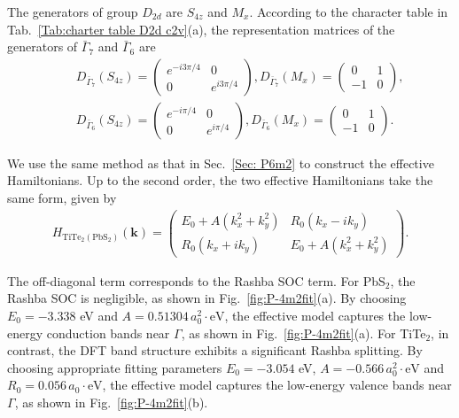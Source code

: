 \documentclass[aps, preprint, prb,]{revtex4-2}
\begin{document}
The generators of group $D_{2d}$ are $S_{4z}$ and $M_x$. According to the character table in Tab.~\ref{Tab:charter table D2d c2v}(a), the representation matrices of the generators  of $\bar{\Gamma}_7$ and $\bar{\Gamma}_6$ are 
\begin{eqnarray}
&&D_{\bar{\Gamma}_7}(S_{4z})=
\begin{pmatrix}
e^{-i3\pi/4} & 0\\
0 & e^{i3\pi/4}
\end{pmatrix},  
D_{\bar{\Gamma}_7}(M_x)=
\begin{pmatrix}
0 & 1\\
-1 & 0
\end{pmatrix},\\
&&D_{\bar{\Gamma}_6}(S_{4z})=
\begin{pmatrix}
e^{-i\pi/4} & 0\\
0 & e^{i\pi/4}
\end{pmatrix},  
D_{\bar{\Gamma}_6}(M_x)=
\begin{pmatrix}
0 & 1\\
-1 & 0
\end{pmatrix}.
\end{eqnarray}

We use the same method as that in Sec.~\ref{Sec: P6m2} to construct the effective Hamiltonians. Up to the second order, the two effective Hamiltonians take the same form, given by 
\begin{eqnarray}
H_{\mathrm{TiTe}_2(\mathrm{PbS}_2)}(\mathbf{k})=
\begin{pmatrix}
E_0+A(k_x^2+k_y^2) & R_0(k_x-i k_y)\\
R_0(k_x+i k_y) & E_0+A(k_x^2+k_y^2)
\end{pmatrix}.    
\end{eqnarray}

The off-diagonal term corresponds to the Rashba SOC term. For PbS$_2$, the Rashba SOC is negligible, as shown in Fig.~\ref{fig:P-4m2fit}(a). By choosing $E_0=-3.338$ eV and $A=0.51304\,a_0^2\cdot\mathrm{eV}$, the effective model captures the low-energy conduction bands near $\Gamma$, as shown in Fig.~\ref{fig:P-4m2fit}(a). For TiTe$_2$, in contrast, the DFT band structure exhibits a significant Rashba splitting. By choosing appropriate fitting parameters $E_0=-3.054$ eV, $A=-0.566\,a_0^2\cdot\mathrm{eV}$ and $R_0=0.056\,a_0\cdot\mathrm{eV}$, the effective model captures the low-energy valence bands near $\Gamma$, as shown in Fig.~\ref{fig:P-4m2fit}(b).
\end{document}
